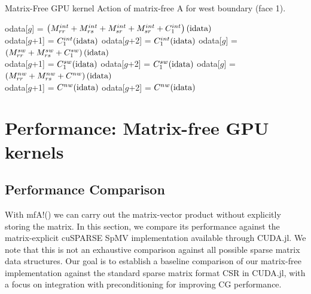 \begin{algorithm*}
\caption{Matrix-Free GPU kernel Action of matrix-free A for west boundary (face 1).}
\label{alg:mfA-2}
\begin{algorithmic}
 
\State odata[$g$] = $\left(M_{rr}^{int} + M_{rs}^{int} + M_{sr}^{int} + M_{sr}^{int} + C_1^{int}\right)(\textnormal{idata})$ \\ 
\State  odata[$g$+1] = $C_1^{int}(\textnormal{idata})$
\State odata[$g$+2] = $C_1^{int}(\textnormal{idata})$
\EndIf
{} 
\State odata[$g$] = $\left(M_{rr}^{sw} + M_{rs}^{sw} + C_1^{sw}\right)(\textnormal{idata})$ \\ 
\State  odata[$g$+1] = $C_1^{sw}(\textnormal{idata})$
\State odata[$g$+2] = $C_1^{sw}(\textnormal{idata})$
\EndIf
{}
\State odata[$g$] = $\left(M_{rr}^{nw} + M_{rs}^{nw} + C^{nw}\right)(\textnormal{idata})$ \\ 
\State odata[$g$+1] = $C^{nw}(\textnormal{idata})$
\State odata[$g$+2] = $C^{nw}(\textnormal{idata})$
\EndIf
\end{algorithmic}
\end{algorithm*}



\section{Performance: Matrix-free GPU kernels}
\subsection{Performance Comparison}\label{sec: comparison}
With {\ttfamily mfA!}() we can carry out the matrix-vector product without explicitly storing the matrix. In this section, we compare its performance against the matrix-explicit cuSPARSE SpMV implementation available through CUDA.jl. We note that this is not an exhaustive comparison against all possible sparse matrix data structures.  Our goal is to establish a baseline comparison of our matrix-free implementation against the standard sparse matrix format CSR in CUDA.jl, with a focus on integration with preconditioning for improving CG performance.  





